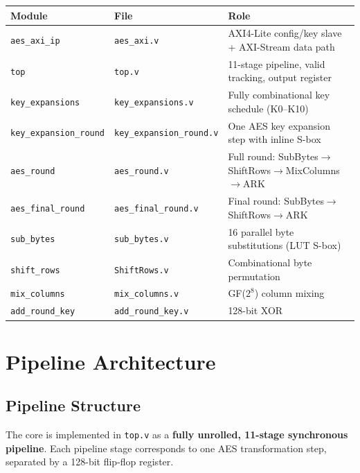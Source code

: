 \documentclass[12pt,a4paper]{article}
\begin{document}
\begin{table}[H]
\centering
\begin{tabularx}{\textwidth}{@{}llX@{}}
\toprule
\textbf{Module} & \textbf{File} & \textbf{Role}\\
\midrule
\texttt{aes\_axi\_ip}       & \texttt{aes\_axi.v}            & AXI4-Lite config/key slave + AXI-Stream data path\\
\texttt{top}                & \texttt{top.v}                 & 11-stage pipeline, valid tracking, output register\\
\texttt{key\_expansions}    & \texttt{key\_expansions.v}     & Fully combinational key schedule (K0--K10)\\
\texttt{key\_expansion\_round} & \texttt{key\_expansion\_round.v} & One AES key expansion step with inline S-box\\
\texttt{aes\_round}         & \texttt{aes\_round.v}          & Full round: SubBytes$\to$ShiftRows$\to$MixColumns$\to$ARK\\
\texttt{aes\_final\_round}  & \texttt{aes\_final\_round.v}   & Final round: SubBytes$\to$ShiftRows$\to$ARK\\
\texttt{sub\_bytes}         & \texttt{sub\_bytes.v}          & 16 parallel byte substitutions (LUT S-box)\\
\texttt{shift\_rows}        & \texttt{ShiftRows.v}           & Combinational byte permutation\\
\texttt{mix\_columns}       & \texttt{mix\_columns.v}        & GF($2^8$) column mixing\\
\texttt{add\_round\_key}    & \texttt{add\_round\_key.v}     & 128-bit XOR\\
\bottomrule
\end{tabularx}
\end{table}

\section{Pipeline Architecture}

\subsection{Pipeline Structure}

The core is implemented in \texttt{top.v} as a \textbf{fully unrolled,
11-stage synchronous pipeline}. Each pipeline stage corresponds to one AES
transformation step, separated by a 128-bit flip-flop register.
\end{document}
